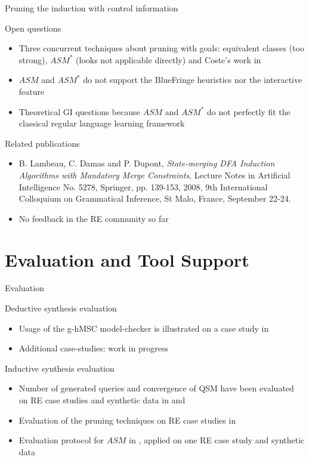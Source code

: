 \documentclass[11pt]{beamer}
\begin{document}
\begin{frame}{Pruning the induction with control information}
	\begin{block}{Open questions}
		\begin{itemize}
			\item Three concurrent techniques about pruning with goals: equivalent classes (too strong), $ASM^*$ (looks not 
				applicable directly) and Coste's work in \cite{Coste04}
			\item $ASM$ and $ASM^*$ do not support the BlueFringe heuristics nor the interactive feature
			\item Theoretical GI questions because $ASM$ and $ASM^*$ do not perfectly fit the classical regular language learning framework
		\end{itemize}
	\end{block}
	\begin{block}{Related publications}
   		\scriptsize
		\begin{itemize}
			\item B. Lambeau, C. Damas and P. Dupont, \emph{State-merging DFA Induction Algorithms with Mandatory Merge Constraints}, 
	                             Lecture Notes in Artificial Intelligence No. 5278, Springer, pp. 139-153, 2008, 9th International Colloquium on Grammatical Inference, 
	                             St Malo, France, September 22-24.
			\item No feedback in the RE community so far
		\end{itemize}
	   \end{block}
\end{frame}

\section{Evaluation and Tool Support}
\begin{frame}{Evaluation}
	\begin{block}{Deductive synthesis evaluation}
		\begin{itemize}
			\item Usage of the g-hMSC model-checker is illustrated on a case study in \cite{Damas09}
			\item Additional case-studies: work in progress 
		\end{itemize}
	\end{block}
	\begin{block}{Inductive synthesis evaluation}
		\begin{itemize}
			\item Number of generated queries and convergence of QSM have been evaluated on RE case studies and synthetic data in \cite{Damas05} and \cite{Dupont08}
			\item Evaluation of the pruning techniques on RE case studies in \cite{Damas06}
			\item Evaluation protocol for $ASM$ in \cite{Lambeau08}, applied on one RE case study and synthetic data
		\end{itemize}
	\end{block}
\end{frame}
\end{document}
